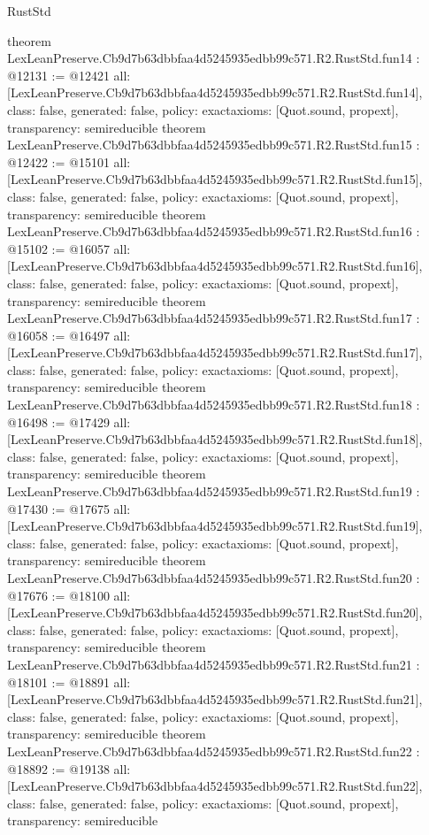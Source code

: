 \begin{lexlean}{RustStd}
\begin{coremodule}
{}
theorem LexLeanPreserve.Cb9d7b63dbbfaa4d5245935edbb99c571.R2.RustStd.fun14 : @12131 := @12421 {
  all: [LexLeanPreserve.Cb9d7b63dbbfaa4d5245935edbb99c571.R2.RustStd.fun14],
  class: false,
  generated: false,
  policy: exact{axioms: [Quot.sound, propext]},
  transparency: semireducible
}
theorem LexLeanPreserve.Cb9d7b63dbbfaa4d5245935edbb99c571.R2.RustStd.fun15 : @12422 := @15101 {
  all: [LexLeanPreserve.Cb9d7b63dbbfaa4d5245935edbb99c571.R2.RustStd.fun15],
  class: false,
  generated: false,
  policy: exact{axioms: [Quot.sound, propext]},
  transparency: semireducible
}
theorem LexLeanPreserve.Cb9d7b63dbbfaa4d5245935edbb99c571.R2.RustStd.fun16 : @15102 := @16057 {
  all: [LexLeanPreserve.Cb9d7b63dbbfaa4d5245935edbb99c571.R2.RustStd.fun16],
  class: false,
  generated: false,
  policy: exact{axioms: [Quot.sound, propext]},
  transparency: semireducible
}
theorem LexLeanPreserve.Cb9d7b63dbbfaa4d5245935edbb99c571.R2.RustStd.fun17 : @16058 := @16497 {
  all: [LexLeanPreserve.Cb9d7b63dbbfaa4d5245935edbb99c571.R2.RustStd.fun17],
  class: false,
  generated: false,
  policy: exact{axioms: [Quot.sound, propext]},
  transparency: semireducible
}
theorem LexLeanPreserve.Cb9d7b63dbbfaa4d5245935edbb99c571.R2.RustStd.fun18 : @16498 := @17429 {
  all: [LexLeanPreserve.Cb9d7b63dbbfaa4d5245935edbb99c571.R2.RustStd.fun18],
  class: false,
  generated: false,
  policy: exact{axioms: [Quot.sound, propext]},
  transparency: semireducible
}
theorem LexLeanPreserve.Cb9d7b63dbbfaa4d5245935edbb99c571.R2.RustStd.fun19 : @17430 := @17675 {
  all: [LexLeanPreserve.Cb9d7b63dbbfaa4d5245935edbb99c571.R2.RustStd.fun19],
  class: false,
  generated: false,
  policy: exact{axioms: [Quot.sound, propext]},
  transparency: semireducible
}
theorem LexLeanPreserve.Cb9d7b63dbbfaa4d5245935edbb99c571.R2.RustStd.fun20 : @17676 := @18100 {
  all: [LexLeanPreserve.Cb9d7b63dbbfaa4d5245935edbb99c571.R2.RustStd.fun20],
  class: false,
  generated: false,
  policy: exact{axioms: [Quot.sound, propext]},
  transparency: semireducible
}
theorem LexLeanPreserve.Cb9d7b63dbbfaa4d5245935edbb99c571.R2.RustStd.fun21 : @18101 := @18891 {
  all: [LexLeanPreserve.Cb9d7b63dbbfaa4d5245935edbb99c571.R2.RustStd.fun21],
  class: false,
  generated: false,
  policy: exact{axioms: [Quot.sound, propext]},
  transparency: semireducible
}
theorem LexLeanPreserve.Cb9d7b63dbbfaa4d5245935edbb99c571.R2.RustStd.fun22 : @18892 := @19138 {
  all: [LexLeanPreserve.Cb9d7b63dbbfaa4d5245935edbb99c571.R2.RustStd.fun22],
  class: false,
  generated: false,
  policy: exact{axioms: [Quot.sound, propext]},
  transparency: semireducible
}
\end{coremodule}
\end{lexlean}

